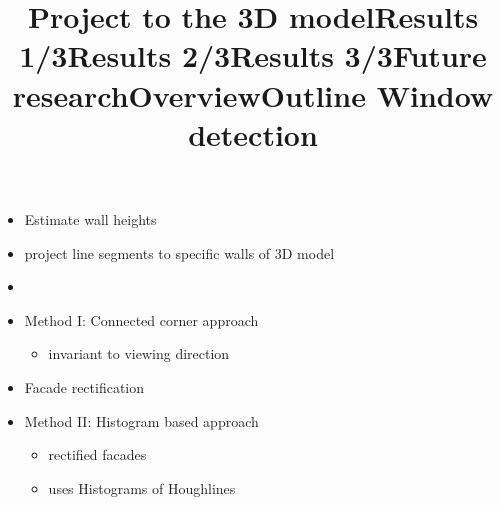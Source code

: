 

\title{Project to the 3D model}
\begin{itemize}
\item Estimate wall heights 
\item project line segments to specific walls of 3D model
\item
\end{itemize}


\title{Results 1/3}


\title{Results 2/3}


\title{Results 3/3}

\title{Future research}


\title{Overview}

\title{Outline Window detection}
\begin{itemize}
\item Method I: Connected corner approach 
	\begin{itemize}
	\item invariant to viewing direction
	\end{itemize}
\item Facade rectification 
\item Method II: Histogram based approach
	\begin{itemize}
	\item rectified facades 
	\item uses Histograms of Houghlines
	\end{itemize}
\end{itemize}


